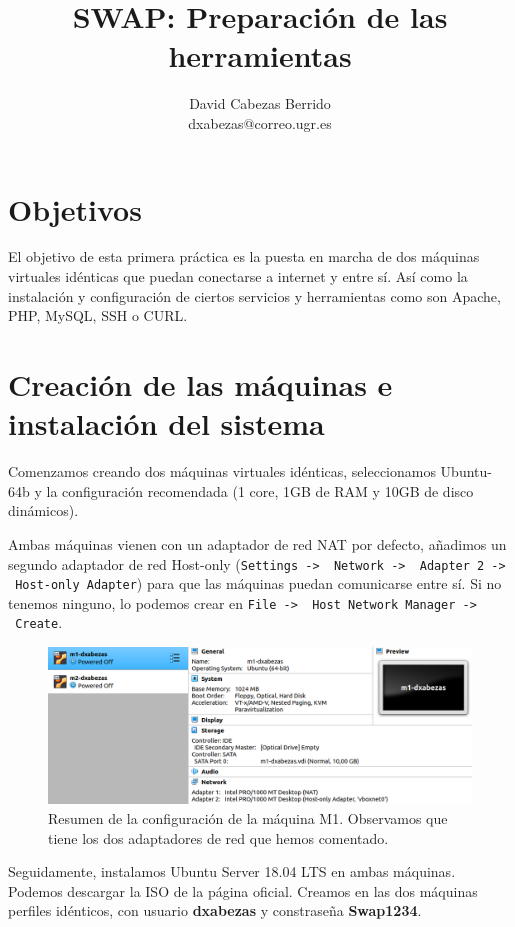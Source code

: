 \documentclass{article}
\title{\Huge SWAP: Preparación de las herramientas\vspace{10mm}}
\author{\huge David Cabezas Berrido \vspace{10mm} \\ 
  \huge dxabezas@correo.ugr.es \vspace{10mm}}
\begin{document}
\maketitle
\tableofcontents
\newpage

\section{Objetivos}

El objetivo de esta primera práctica es la puesta en marcha de dos máquinas virtuales idénticas que puedan conectarse a internet y entre sí.
Así como la instalación y configuración de ciertos servicios y herramientas como son Apache, PHP, MySQL, SSH o CURL.

\section{Creación de las máquinas e instalación del sistema}

Comenzamos creando dos máquinas virtuales idénticas, seleccionamos Ubuntu-64b y la configuración recomendada (1 core, 1GB de RAM y 10GB de disco dinámicos).

Ambas máquinas vienen con un adaptador de red NAT por defecto, añadimos un segundo adaptador de red Host-only (\texttt{Settings -> \ Network 
	-> \ Adapter 2 -> \ Host-only Adapter})
para que las máquinas puedan comunicarse entre sí. Si no tenemos ninguno, lo podemos crear en \texttt{File -> \ Host Network Manager -> \ Create}.

\begin{figure}[H]
	\centering
	\includegraphics[width=160mm]{imgs/maquinas}
	\caption{Resumen de la configuración de la máquina M1. Observamos que tiene los dos adaptadores de red que hemos comentado.}
	\label{fig:maquinas}
\end{figure}

Seguidamente, instalamos Ubuntu Server 18.04 LTS en ambas máquinas. Podemos descargar la ISO de la página oficial. Creamos en las dos máquinas perfiles idénticos, con usuario \textbf{dxabezas} y constraseña \textbf{Swap1234}.
\end{document}

